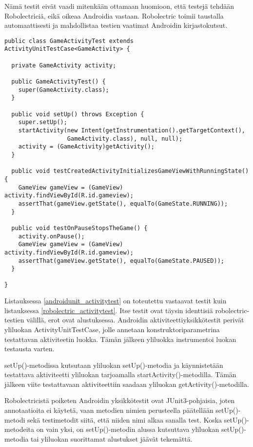 Nämä testit eivät vaadi mitenkään ottamaan huomioon, että testejä tehdään Robolectriciä, eikä oikeaa Androidia vastaan. Robolectric toimii taustalla automaattisesti ja mahdollistaa testien vaatimat Androidin kirjastokutsut.

\begin{lstlisting}[float,label=androidunit_activitytest,caption=ActivityUnitTestCase]
public class GameActivityTest extends ActivityUnitTestCase<GameActivity> {

  private GameActivity activity;

  public GameActivityTest() {
  	super(GameActivity.class);
  }

  public void setUp() throws Exception {
  	super.setUp();
  	startActivity(new Intent(getInstrumentation().getTargetContext(), 
  	              GameActivity.class), null, null);
    activity = (GameActivity)getActivity();
  }

  public void testCreatedActivityInitializesGameViewWithRunningState() {
    GameView gameView = (GameView) activity.findViewById(R.id.gameview);
    assertThat(gameView.getState(), equalTo(GameState.RUNNING));
  }
  
  public void testOnPauseStopsTheGame() {
  	activity.onPause();
  	GameView gameView = (GameView) activity.findViewById(R.id.gameview);
  	assertThat(gameView.getState(), equalTo(GameState.PAUSED));
  }
  
}
\end{lstlisting}

Listauksessa \ref{androidunit_activitytest} on toteutettu vastaavat testit kuin listauksessa \ref{robolectric_activitytest}. Itse testit ovat täysin identtisiä robolectric-testien välillä, erot ovat alustuksessa. Androidin aktiviteettiyksikkötestit perivät yliluokan ActivityUnitTestCase, jolle annetaan konstruktoriparametrina testattavan aktiviteetin luokka. Tämän jälkeen yliluokka instrumentoi luokan testausta varten.

setUp()-metodissa kutsutaan yliluokan setUp()-metodia ja käynnistetään testattava aktiviteetti yliluokan tarjoamalla startActivity()-metodilla. Tämän jälkeen viite testattavaan aktiviteettiin saadaan yliluokan getActivity()-metodilla.

Robolectricistä poiketen Androidin yksikkötestit ovat JUnit3-pohjaisia, joten annotaatioita ei käytetä, vaan metodien nimien perusteella päätellään setUp()-metodi sekä testimetodit siitä, että niiden nimi alkaa sanalla test. Koska setUp()-metodeita on vain yksi, on setUp()-metodin alussa kutsuttava yliluokan setUp()-metodia tai yliluokan suorittamat alustukset jäävät tekemättä.

